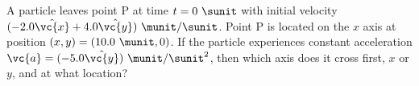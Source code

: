 A particle leaves point P at time $t=0\ \sunit$ with initial velocity
$(-2.0\hat{\vc{x}}+4.0\hat{\vc{y}})\ \munit/\sunit$. Point P is located on the
$x$ axis at position $(x,y) = (10.0\ \munit,0)$. If the particle
experiences constant acceleration $\vc{a} = (-5.0\hat{\vc{y}})\ \munit/\sunit^2$,
then which axis does it cross first, $x$ or $y$, and at what location?
